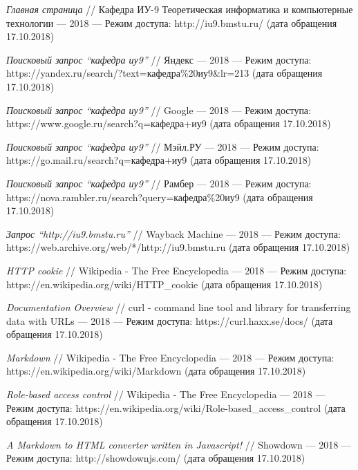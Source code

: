 \documentclass[14pt]{extarticle}
\begin{document}
\newpage
{}
\begin{thebibliography}{9} %
\textit{Главная страница} //
Кафедра ИУ-9 Теоретическая информатика и компьютерные технологии --- 2018 --- Режим доступа: http://iu9.bmstu.ru/ (дата обращения 17.10.2018)


\textit{Поисковый запрос \enquote{кафедра иу9}} //
Яндекс --- 2018 --- Режим доступа: https://yandex.ru/search/?text=кафедра\%20иу9\&lr=213 (дата обращения 17.10.2018)

\textit{Поисковый запрос \enquote{кафедра иу9}} //
Google --- 2018 --- Режим доступа: https://www.google.ru/search?q=кафедра+иу9 (дата обращения 17.10.2018)

\textit{Поисковый запрос \enquote{кафедра иу9}} //
Мэйл.РУ  --- 2018 --- Режим доступа: https://go.mail.ru/search?q=кафедра+иу9 (дата обращения 17.10.2018)

\textit{Поисковый запрос \enquote{кафедра иу9}} //
Рамбер  --- 2018 --- Режим доступа: https://nova.rambler.ru/search?query=кафедра\%20иу9 (дата обращения 17.10.2018)

\textit{Запрос \enquote{http://iu9.bmstu.ru}} //
Wayback Machine --- 2018 --- Режим доступа: https://web.archive.org/web/*/http://iu9.bmstu.ru (дата обращения 17.10.2018)

\textit{HTTP cookie} //
Wikipedia - The Free Encyclopedia --- 2018 --- Режим доступа: https://en.wikipedia.org/wiki/HTTP\_cookie (дата обращения 17.10.2018)

\textit{Documentation Overview} //
curl - command line tool and library for transferring data with URLs --- 2018 --- Режим доступа: https://curl.haxx.se/docs/ (дата обращения 17.10.2018)

\textit{Markdown} //
Wikipedia - The Free Encyclopedia --- 2018 --- Режим доступа: https://en.wikipedia.org/wiki/Markdown (дата обращения 17.10.2018)

\textit{Role-based access control} //
Wikipedia - The Free Encyclopedia --- 2018 --- Режим доступа: https://en.wikipedia.org/wiki/Role-based\_access\_control (дата обращения 17.10.2018)

\textit{A Markdown to HTML converter written in Javascript!} //
Showdown --- 2018  --- Режим доступа: http://showdownjs.com/ (дата обращения 17.10.2018)


\end{thebibliography}
\end{document}
